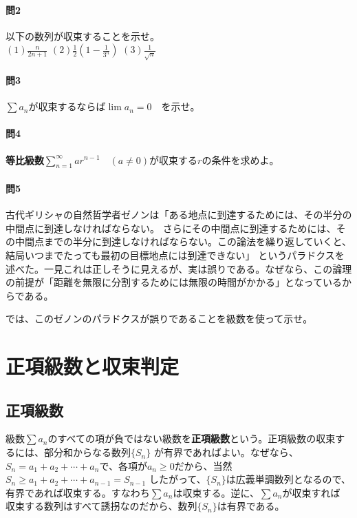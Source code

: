 \documentclass[a4j,dvipdfmx]{jsarticle}
\begin{document}
                \paragraph{問2}以下の数列が収束することを示せ。\\
                $\displaystyle (1)\frac{n}{2n+1}$\hspace{30mm}
                $\displaystyle (2)\frac{1}{2}\left(1-\frac{1}{3^n}\right)$\hspace{30mm}
                $\displaystyle (3)\frac{1}{\sqrt{n}}$

                \paragraph{問3}$\sum a_n$が収束するならば$\lim a_n =0$　を示せ。

                \paragraph{問4}\textbf{等比級数}$\displaystyle \sum_{n=1}^{\infty} ar^{n-1} \quad (a\neq 0)$が収束する$r$の条件を求めよ。

                \paragraph{問5}古代ギリシャの自然哲学者ゼノンは「ある地点に到達するためには、その半分の中間点に到達しなければならない。
                さらにその中間点に到達するためには、その中間点までの半分に到達しなければならない。この論法を繰り返していくと、結局いつまでたっても最初の目標地点には到達できない」
                というパラドクスを述べた。一見これは正しそうに見えるが、実は誤りである。なぜなら、この論理の前提が「距離を無限に分割するためには無限の時間がかかる」となっているからである。
                
                では、このゼノンのパラドクスが誤りであることを級数を使って示せ。
        \clearpage    
        \section{正項級数と収束判定}
            \subsection{正項級数}
                級数$\sum a_n$のすべての項が負ではない級数を\textbf{正項級数}という。正項級数の収束するには、部分和からなる数列$\{S_n\}$
                が有界であればよい。なぜなら、$S_n=a_1+a_2+\cdots+a_n$で、各項が$a_n \geq 0$だから、当然$S_n \geq a_1+a_2+\cdots+a_{n-1}=S_{n-1}$
                したがって、$\{S_n\}$は広義単調数列となるので、有界であれば収束する。すなわち$\sum a_n$は収束する。逆に、$\sum a_n$が収束すれば
                収束する数列はすべて誘拐なのだから、数列$\{S_n\}$は有界である。
\end{document}
